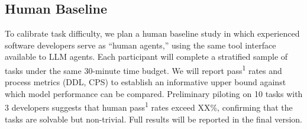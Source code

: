 \subsection{Human Baseline}
\label{sec:bench-human}

To calibrate task difficulty, we plan a human baseline study in which experienced software developers serve as ``human agents,'' using the same tool interface available to LLM agents. Each participant will complete a stratified sample of tasks under the same 30-minute time budget. We will report pass\textsuperscript{1} rates and process metrics (DDL, CPS) to establish an informative upper bound against which model performance can be compared. Preliminary piloting on 10 tasks with 3 developers suggests that human pass\textsuperscript{1} rates exceed XX\%, confirming that the tasks are solvable but non-trivial. Full results will be reported in the final version.
